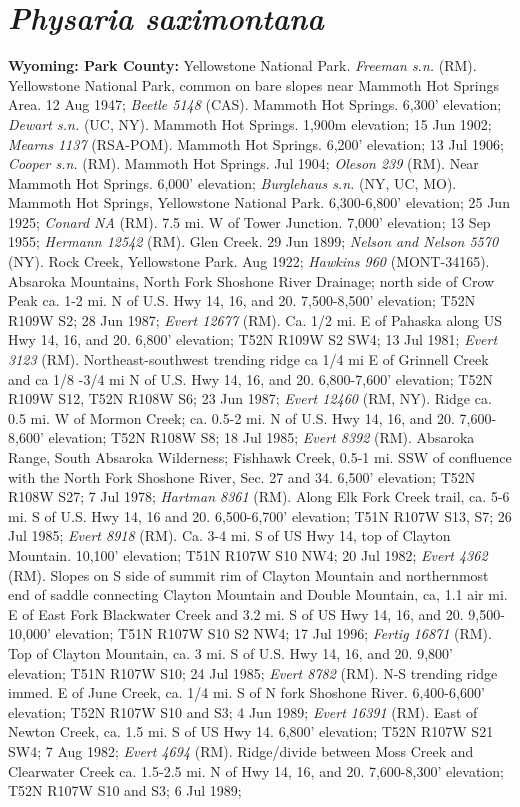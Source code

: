 \section*{\textit{Physaria saximontana}}

\textbf{Wyoming: Park County:} Yellowstone National Park. \textit{Freeman s.n.} (RM).  Yellowstone National Park, common on bare slopes near Mammoth Hot Springs Area. 12 Aug 1947; \textit{Beetle 5148} (CAS).  Mammoth Hot Springs. 6,300' elevation; \textit{Dewart s.n.} (UC, NY).  Mammoth Hot Springs. 1,900m elevation; 15 Jun 1902; \textit{Mearns 1137} (RSA-POM).  Mammoth Hot Springs. 6,200' elevation; 13 Jul 1906; \textit{Cooper s.n.} (RM).  Mammoth Hot Springs. Jul 1904; \textit{Oleson 239} (RM).  Near Mammoth Hot Springs. 6,000' elevation; \textit{Burglehaus s.n.} (NY, UC, MO).  Mammoth Hot Springs, Yellowstone National Park. 6,300-6,800' elevation; 25 Jun 1925; \textit{Conard NA} (RM).  7.5 mi. W of Tower Junction. 7,000' elevation; 13 Sep 1955; \textit{Hermann 12542} (RM).  Glen Creek. 29 Jun 1899; \textit{Nelson and Nelson 5570} (NY).  Rock Creek, Yellowstone Park. Aug 1922; \textit{Hawkins 960} (MONT-34165).  Absaroka Mountains, North Fork Shoshone River Drainage; north side of Crow Peak ca. 1-2 mi. N of U.S. Hwy 14, 16, and 20. 7,500-8,500’ elevation; T52N R109W S2; 28 Jun 1987; \textit{Evert 12677} (RM).  Ca. 1/2 mi. E of Pahaska along US Hwy 14, 16, and 20. 6,800’ elevation; T52N R109W S2 SW4; 13 Jul 1981; \textit{Evert 3123} (RM).  Northeast-southwest trending ridge ca 1/4 mi E of Grinnell Creek and ca 1/8 -3/4 mi N of U.S. Hwy 14, 16, and 20. 6,800-7,600’ elevation; T52N R109W S12, T52N R108W S6; 23 Jun 1987; \textit{Evert 12460} (RM, NY).  Ridge ca. 0.5 mi. W of Mormon Creek; ca. 0.5-2 mi. N of U.S. Hwy 14, 16, and 20. 7,600-8,600’ elevation; T52N R108W S8; 18 Jul 1985; \textit{Evert 8392} (RM).  Absaroka Range, South Absaroka Wilderness; Fishhawk Creek, 0.5-1 mi. SSW of confluence with the North Fork Shoshone River, Sec. 27 and 34. 6,500’ elevation; T52N R108W S27; 7 Jul 1978; \textit{Hartman 8361} (RM).  Along Elk Fork Creek trail, ca. 5-6 mi. S of U.S. Hwy 14, 16 and 20. 6,500-6,700’ elevation; T51N R107W S13, S7; 26 Jul 1985; \textit{Evert 8918} (RM).  Ca. 3-4 mi. S of US Hwy 14, top of Clayton Mountain. 10,100’ elevation; T51N R107W S10 NW4; 20 Jul 1982; \textit{Evert 4362} (RM).  Slopes on S side of summit rim of Clayton Mountain and northernmost end of saddle connecting Clayton Mountain and Double Mountain, ca, 1.1 air mi. E of East Fork Blackwater Creek and 3.2 mi. S of US Hwy 14, 16, and 20. 9,500-10,000’ elevation; T51N R107W S10 S2 NW4; 17 Jul 1996; \textit{Fertig 16871} (RM).  Top of Clayton Mountain, ca. 3 mi. S of U.S. Hwy 14, 16, and 20. 9,800’ elevation; T51N R107W S10; 24 Jul 1985; \textit{Evert 8782} (RM).  N-S trending ridge immed. E of June Creek, ca. 1/4 mi. S of N fork Shoshone River. 6,400-6,600’ elevation; T52N R107W S10 and S3; 4 Jun 1989; \textit{Evert 16391} (RM).  East of Newton Creek, ca. 1.5 mi. S of US Hwy 14. 6,800’ elevation; T52N R107W S21 SW4; 7 Aug 1982; \textit{Evert 4694} (RM).  Ridge/divide between Moss Creek and Clearwater Creek ca. 1.5-2.5 mi. N of Hwy 14, 16, and 20. 7,600-8,300’ elevation; T52N R107W S10 and S3; 6 Jul 1989; 